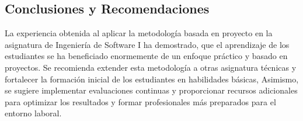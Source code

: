 \documentclass[12pt]{article}
\begin{document}
\begin{multicols}{2}
\section{Conclusiones y Recomendaciones}
\label{sec:concl-y-recom}

La experiencia obtenida al aplicar la metodología basada en proyecto en la asignatura de Ingeniería de Software I ha demostrado, que el aprendizaje de los estudiantes se ha beneficiado enormemente de un enfoque práctico y basado en proyectos. Se  recomienda extender esta metodología a otras asignatura técnicas y fortalecer la formación inicial de los estudiantes en habilidades básicas, Asimismo, se sugiere implementar evaluaciones continuas y proporcionar recursos adicionales para optimizar los resultados  y formar profesionales más preparados para el entorno laboral.






\end{multicols}
\end{document}
